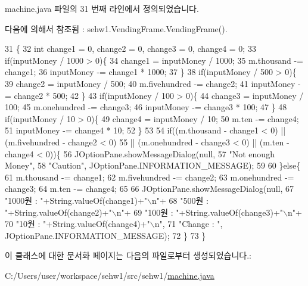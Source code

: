 machine.\+java 파일의 31 번째 라인에서 정의되었습니다.



다음에 의해서 참조됨 \+:  sehw1.\+Vending\+Frame.\+Vending\+Frame().


\begin{DoxyCode}
31                              \{
32         \textcolor{keywordtype}{int} change1 = 0, change2 = 0, change3 = 0, change4 = 0;
33         \textcolor{keywordflow}{if}(inputMoney / 1000 > 0)\{
34             change1 = inputMoney / 1000;
35             m.thousand -= change1;
36             inputMoney -= change1 * 1000;
37         \}
38         \textcolor{keywordflow}{if}(inputMoney / 500 > 0)\{
39             change2 = inputMoney / 500;
40             m.fivehundred -= change2;
41             inputMoney -= change2 * 500;
42         \}
43         \textcolor{keywordflow}{if}(inputMoney / 100 > 0)\{
44             change3 = inputMoney / 100;
45             m.onehundred -= change3;
46             inputMoney -= change3 * 100;
47         \}
48         \textcolor{keywordflow}{if}(inputMoney / 10 > 0)\{
49             change4 = inputMoney / 10;
50             m.ten -= change4;
51             inputMoney -= change4 * 10;
52         \}
53         
54         \textcolor{keywordflow}{if}((m.thousand - change1 < 0) || (m.fivehundred - change2 < 0) 
55                 || (m.onehundred - change3 < 0) || (m.ten - change4 < 0))\{
56             JOptionPane.showMessageDialog(null,
57                     \textcolor{stringliteral}{"Not enough Money"}, 
58                     \textcolor{stringliteral}{"Caution"}, JOptionPane.INFORMATION\_MESSAGE);
59 
60         \}\textcolor{keywordflow}{else}\{
61             m.thousand -= change1;
62             m.fivehundred -= change2;
63             m.onehundred -= change3;
64             m.ten -= change4;
65 
66             JOptionPane.showMessageDialog(null, 
67                       \textcolor{stringliteral}{"1000원 :         "}+String.valueOf(change1)+\textcolor{stringliteral}{"\(\backslash\)n"}+
68                       \textcolor{stringliteral}{"500원 :      "}+String.valueOf(change2)+\textcolor{stringliteral}{"\(\backslash\)n"}+
69                       \textcolor{stringliteral}{"100원 :      "}+String.valueOf(change3)+\textcolor{stringliteral}{"\(\backslash\)n"}+
70                       \textcolor{stringliteral}{"10원 :      "}+String.valueOf(change4)+\textcolor{stringliteral}{"\(\backslash\)n"}, 
71                       \textcolor{stringliteral}{"Change :      "}, JOptionPane.INFORMATION\_MESSAGE);
72         \}
73     \}
\end{DoxyCode}


이 클래스에 대한 문서화 페이지는 다음의 파일로부터 생성되었습니다.\+:\begin{DoxyCompactItemize}
\item 
C\+:/\+Users/user/workspace/sehw1/src/sehw1/\hyperlink{machine_8java}{machine.\+java}\end{DoxyCompactItemize}

